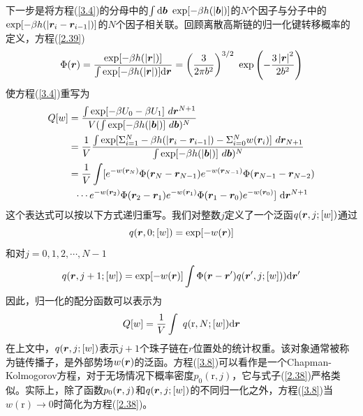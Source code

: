 下一步是将方程(\ref{3.4})的分母中的$\int\mathrm{d}\bm{b}~\exp[-\beta h(\left|\bm{b}\right|)]$的$N$个因子与分子中的$\exp[-\beta h(\left|\bm{r}_i-\bm{r}_{i-1}\right|)]$的$N$个因子相关联。回顾离散高斯链的归一化键转移概率的定义，方程(\ref{2.39})
\begin{equation}\label{3.5}
\Phi(\bm{r})=\frac{\exp[-\beta h(\left|\bm{r}\right|)]}{\int\exp[-\beta h(\left|\bm{r}\right|)]\mathrm{d}\bm{r}}=\left(\frac{3}{2\pi b^2}\right)^{3/2}~\exp\left(-\frac{3\left|\bm{r}\right|^2}{2b^2}\right)
\end{equation}
使方程(\ref{3.4})重写为
\begin{equation}\label{3.6}
\begin{aligned}
Q[w]&=\frac{\int \exp[-\beta U_0 - \beta U_1]~d\bm{r}^{N+1}}{V(\int \exp[-\beta h(|\bm{b}|)]~d\bm{b})^{N}}\\
&=\frac{1}{V} \frac{\int \exp [\Sigma_{i=1}^{N}-\beta h(|\bm{r}_{i} - \bm{r}_{i-1}|)- \Sigma_{i=0}^{N} w(\bm{r}_{i})]~d\bm{r}_{N+1}}{\int \exp[-\beta h(|\bm{b}|)]~d\bm{b})^{N}}\\
&=\frac{1}{V}\int[e^{-w(\bm{r}_N)}\Phi(\bm{r}_N-\bm{r}_{N-1})e^{-w(\bm{r}_{N-1})}\Phi(\bm{r}_{N-1}-\bm{r}_{N-2})\\
&~~\cdots e^{-w(\bm{r}_2)}\Phi(\bm{r}_2-\bm{r}_1)e^{-w(\bm{r}_1)}\Phi(\bm{r}_1-\bm{r}_0)e^{-w(\bm{r}_0)}]~\mathrm{d}\bm{r}^{N+1}
\end{aligned}
\end{equation}
这个表达式可以按以下方式递归重写。我们对整数$j$定义了一个泛函$q(\bm{r},j;[w])$通过
\begin{equation}\label{3.7}
q(\bm{r},0;[w])=\exp[-w(\bm{r})]
\end{equation}
和对$j=0,1,2,\cdots,N-1$
\begin{equation}\label{3.8}
q(\bm{r},j+1;[w])=\exp[-w(\bm{r})]\int\Phi(\bm{r}-\bm{r}')q(\bm{r}',j;[w]))\mathrm{d}\bm{r}'
\end{equation}
因此，归一化的配分函数可以表示为
\begin{equation}\label{3.9}
Q[w]=\frac{1}{V}\int~q(\mathrm{r},N;[w])\mathrm{d}\bm{r}
\end{equation}
在上文中，$q(\bm{r},j;[w])$表示$j+1$个珠子链在$r$位置处的统计权重。该对象通常被称为链传播子，是外部势场$w(\bm{r})$的泛函。方程(\ref{3.8})可以看作是一个Chapman-Kolmogorov方程，对于无场情况下概率密度$p_0(\mathrm{r},j)$，它与式子(\ref{2.38})严格类似。实际上，除了函数$p_0(\bm{r},j)$和$q(\bm{r},j;[w])$的不同归一化之外，方程(\ref{3.8})当$w(\mathrm{r})\rightarrow 0$时简化为方程(\ref{2.38})。

